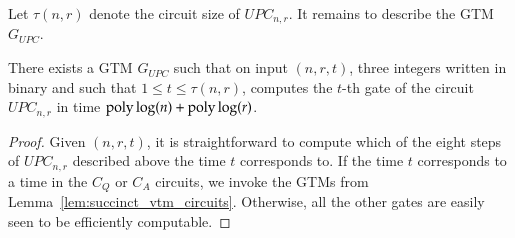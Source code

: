 Let $\tau(n,r)$ denote the circuit size of $UPC_{n,r}$. It remains to describe the GTM $G_{UPC}$. 

\begin{lemma}
	There exists a GTM $G_{UPC}$ such that on input $(n,r,t)$, three integers written in binary and such that $1 \leq t \leq \tau(n,r)$, computes the $t$-th gate of the circuit $UPC_{n,r}$ in time $\operatorname{poly}\log(n) + \operatorname{poly} \log(r)$.
\end{lemma}

\begin{proof}
	Given $(n,r,t)$, it is straightforward to compute which of the eight steps of $UPC_{n,r}$ described above the time $t$ corresponds to. If the time $t$ corresponds to a time in the $C_Q$ or $C_A$ circuits, we invoke the GTMs from Lemma~\ref{lem:succinct_vtm_circuits}. Otherwise, all the other gates are easily seen to be efficiently computable. 
	
%	
%	
%	
%	
\end{proof}
